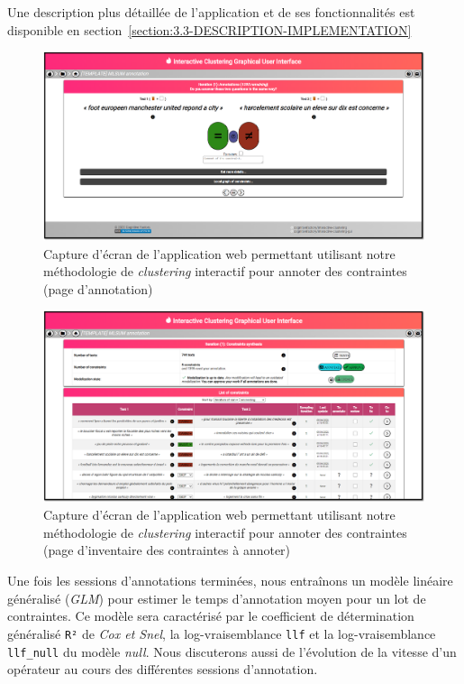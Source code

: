 			Une description plus détaillée de l'application et de ses fonctionnalités est disponible en section~\ref{section:3.3-DESCRIPTION-IMPLEMENTATION}
			\begin{figure}[!htb]
				\centering
				\includegraphics[width=\textwidth]{figures/etude-temps-annotation-0application-annotation}
				\caption{Capture d'écran de l'application web permettant utilisant notre méthodologie de \textit{clustering} interactif pour annoter des contraintes (page d'annotation)}
				\label{figure:4.3.1-ETUDE-COUTS-TEMPS-ANNOTATION-APPLICATION-ANNOTATION}
			\end{figure}
			\begin{figure}[!htb]
				\centering
				\includegraphics[width=\textwidth]{figures/etude-temps-annotation-0application-liste-contraintes}
				\caption{Capture d'écran de l'application web permettant utilisant notre méthodologie de \textit{clustering} interactif pour annoter des contraintes (page d'inventaire des contraintes à annoter)}
				\label{figure:4.3.1-ETUDE-COUTS-TEMPS-ANNOTATION-APPLICATION-LISTE-CONTRAINTES}
			\end{figure}
			
			
			Une fois les sessions d'annotations terminées, nous entraînons un modèle linéaire généralisé (\textit{GLM}) pour estimer le temps d'annotation moyen pour un lot de contraintes. Ce modèle sera caractérisé par le coefficient de détermination généralisé \texttt{R²} de \textit{Cox et Snel}, la log-vraisemblance \texttt{llf} et la log-vraisemblance \texttt{llf\_null} du modèle \textit{null}.
			Nous discuterons aussi de l'évolution de la vitesse d'un opérateur au cours des différentes sessions d'annotation.

